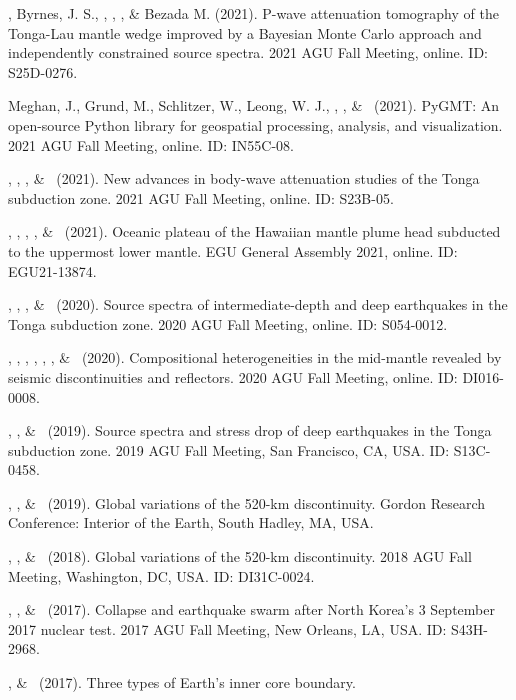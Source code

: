 \begin{etaremune}
\item
	\YZhang, Byrnes, J. S., \SWei, \Me, \FWang, \& Bezada M. (2021).
    P-wave attenuation tomography of the Tonga-Lau mantle wedge improved
    by a Bayesian Monte Carlo approach and independently constrained source spectra.
    2021 AGU Fall Meeting, online. ID: S25D-0276.
\item
	Meghan, J., Grund, M., Schlitzer, W., Leong, W. J., \Me, \JYao, \& \LUieda\ (2021).
    PyGMT: An open-source Python library for geospatial processing, analysis, and visualization.
    2021 AGU Fall Meeting, online. ID: IN55C-08.
\item
	\SWei, \YZhang, \Me, \& \DWiens\ (2021).
    New advances in body-wave attenuation studies of the Tonga subduction zone.
    2021 AGU Fall Meeting, online. ID: S23B-05.
\item
	\SWei, \PShearer, \CLithgowBertelloni, \LStixrude, \& \Me\ (2021).
    Oceanic plateau of the Hawaiian mantle plume head subducted to the uppermost lower mantle.
    EGU General Assembly 2021, online. ID: EGU21-13874.
\item
	\Me, \WWang, \FWang, \& \SWei\ (2020).
    Source spectra of intermediate-depth and deep earthquakes in the Tonga subduction zone.
    2020 AGU Fall Meeting, online. ID: S054-0012.
\item
	\SWei, \Me, \PShearer, \MLv, \SDorfman, \CLithgowBertelloni, \& \LStixrude\ (2020).
    Compositional heterogeneities in the mid-mantle revealed by seismic discontinuities and reflectors.
    2020 AGU Fall Meeting, online. ID: DI016-0008.
\item
	\Me, \WWang, \& \SWei\ (2019).
    Source spectra and stress drop of deep earthquakes in the Tonga subduction zone.
    2019 AGU Fall Meeting, San Francisco, CA, USA. ID: S13C-0458.
\item
    \Me, \SWei, \& \PShearer\ (2019).
    Global variations of the 520-km discontinuity.
    Gordon Research Conference: Interior of the Earth, South Hadley, MA, USA.
\item
    \Me, \SWei, \& \PShearer\ (2018).
    Global variations of the 520-km discontinuity.
    2018 AGU Fall Meeting, Washington, DC, USA. ID: DI31C-0024.
\item
    \Me, \JYao, \& \LWen\ (2017).
    Collapse and earthquake swarm after North Korea's 3 September 2017 nuclear test.
	2017 AGU Fall Meeting, New Orleans, LA, USA. ID: S43H-2968.
\item
    \Me, \& \LWen\ (2017).
    Three types of Earth's inner core boundary.

\end{etaremune}
